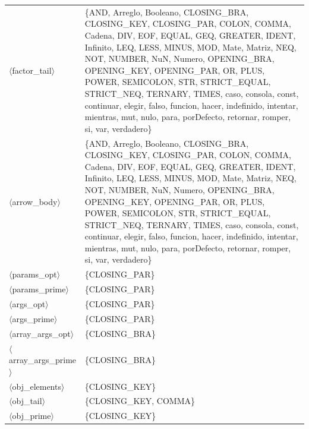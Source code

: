 \documentclass[10pt]{article}
\begin{document}
{\begin{longtable}{@{} p{3.5cm} p{13cm} @{}}
  \parbox[t]{3.3cm}{\raggedright$\langle$factor\_\allowbreak{}tail$\rangle$} & \{AND, Arreglo, Booleano, CLOSING\_BRA, CLOSING\_KEY, CLOSING\_PAR, COLON, COMMA, Cadena, DIV, EOF, EQUAL, GEQ, GREATER, IDENT, Infinito, LEQ, LESS, MINUS, MOD, Mate, Matriz, NEQ, NOT, NUMBER, NuN, Numero, OPENING\_BRA, OPENING\_KEY, OPENING\_PAR, OR, PLUS, POWER, SEMICOLON, STR, STRICT\_EQUAL, STRICT\_NEQ, TERNARY, TIMES, caso, consola, const, continuar, elegir, falso, funcion, hacer, indefinido, intentar, mientras, mut, nulo, para, porDefecto, retornar, romper, si, var, verdadero\} \\
  \parbox[t]{3.3cm}{\raggedright$\langle$arrow\_\allowbreak{}body$\rangle$} & \{AND, Arreglo, Booleano, CLOSING\_BRA, CLOSING\_KEY, CLOSING\_PAR, COLON, COMMA, Cadena, DIV, EOF, EQUAL, GEQ, GREATER, IDENT, Infinito, LEQ, LESS, MINUS, MOD, Mate, Matriz, NEQ, NOT, NUMBER, NuN, Numero, OPENING\_BRA, OPENING\_KEY, OPENING\_PAR, OR, PLUS, POWER, SEMICOLON, STR, STRICT\_EQUAL, STRICT\_NEQ, TERNARY, TIMES, caso, consola, const, continuar, elegir, falso, funcion, hacer, indefinido, intentar, mientras, mut, nulo, para, porDefecto, retornar, romper, si, var, verdadero\} \\
  \parbox[t]{3.3cm}{\raggedright$\langle$params\_\allowbreak{}opt$\rangle$} & \{CLOSING\_PAR\} \\
  \parbox[t]{3.3cm}{\raggedright$\langle$params\_\allowbreak{}prime$\rangle$} & \{CLOSING\_PAR\} \\
  \parbox[t]{3.3cm}{\raggedright$\langle$args\_\allowbreak{}opt$\rangle$} & \{CLOSING\_PAR\} \\
  \parbox[t]{3.3cm}{\raggedright$\langle$args\_\allowbreak{}prime$\rangle$} & \{CLOSING\_PAR\} \\
  \parbox[t]{3.3cm}{\raggedright$\langle$array\_\allowbreak{}args\_\allowbreak{}opt$\rangle$} & \{CLOSING\_BRA\} \\
  \parbox[t]{3.3cm}{\raggedright$\langle$array\_\allowbreak{}args\_\allowbreak{}prime$\rangle$} & \{CLOSING\_BRA\} \\
  \parbox[t]{3.3cm}{\raggedright$\langle$obj\_\allowbreak{}elements$\rangle$} & \{CLOSING\_KEY\} \\
  \parbox[t]{3.3cm}{\raggedright$\langle$obj\_\allowbreak{}tail$\rangle$} & \{CLOSING\_KEY, COMMA\} \\
  \parbox[t]{3.3cm}{\raggedright$\langle$obj\_\allowbreak{}prime$\rangle$} & \{CLOSING\_KEY\} \\
  \bottomrule
\end{longtable}
}
\end{document}
